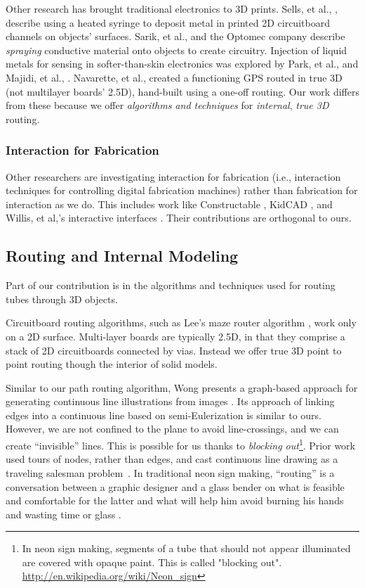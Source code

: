 Other research has brought traditional electronics to 3D prints.  Sells, et al., \cite{Sells-reprap}, describe using a heated syringe to deposit metal in printed 2D circuitboard channels on objects' surfaces.  Sarik, et al., \cite{Sarik-tracebrush} and the Optomec company \cite{optomec} describe \emph{spraying} conductive material onto objects to create circuitry.  Injection of liquid metals for sensing in softer-than-skin electronics was explored by Park, et al., \cite{Park-microchannels} and Majidi, et al., \cite{Majidi-curvature}.  Navarette, et al., created a functioning GPS routed in true 3D (not multilayer boards' 2.5D), hand-built using a one-off routing.  Our work differs from these because we offer \emph{algorithms and techniques} for \emph{internal}, \emph{true 3D} routing.

\subsubsection{Interaction for Fabrication}

Other researchers are investigating interaction for fabrication (i.e., interaction techniques for controlling digital fabrication machines) rather than fabrication for interaction as we do.  This includes work like Constructable \cite{Mueller-constructable}, KidCAD \cite{Follmer-kidcad}, and Willis, et al,'s interactive interfaces \cite{Willis-interactive}. Their contributions are orthogonal to ours.

\subsection{Routing and Internal Modeling}

Part of our contribution is in the algorithms and techniques used for routing tubes through 3D objects.

Circuitboard routing algorithms, such as Lee's maze router algorithm \cite{Lee-maze}, work only on a 2D surface. Multi-layer boards are typically 2.5D, in that they comprise a stack of 2D circuitboards connected by vias.  Instead we offer true 3D point to point routing though the interior of solid models.

Similar to our path routing algorithm, Wong presents a graph-based approach for generating continuous line illustrations from images \cite{Wong-continuousline}. Its approach of linking edges into a continuous line based on semi-Eulerization is similar to ours.  However, we are not confined to the plane to avoid line-crossings, and we can create ``invisible'' lines.  This is possible for us thanks to \emph{blocking out}\footnote{In neon sign making, segments of a tube that should not appear illuminated are covered with opaque paint. This is called "blocking out". \url{http://en.wikipedia.org/wiki/Neon_sign}}. Prior work used tours of nodes, rather than edges, and cast continuous line drawing as a traveling salesman problem~\cite{Bosch-tsp}. In traditional neon sign making, ``routing'' is a conversation between a graphic designer and a glass bender on what is feasible and comfortable for the latter and what will help him avoid burning his hands and wasting time or glass \cite{strattman1997neon}.


